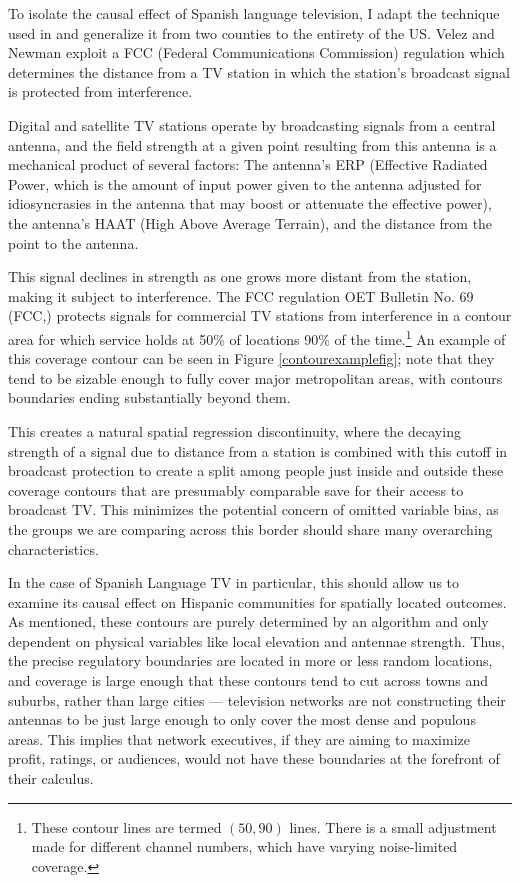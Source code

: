 \documentclass[11pt]{article}
\begin{document}
To isolate the causal effect of Spanish language television, I adapt the technique used in \cite{velez_tuning_2019}  and generalize it from two counties to the entirety of the US. Velez and Newman exploit a FCC (Federal Communications Commission) regulation which determines the distance from a TV station in which the station's broadcast signal is protected from interference.

Digital and satellite TV stations operate by broadcasting signals from a central antenna, and the field strength at a given point resulting from this antenna is a mechanical product of several factors: The antenna's ERP (Effective Radiated Power, which is the amount of input power given to the antenna adjusted for idiosyncrasies in the antenna that may boost or attenuate the effective power), the antenna's HAAT (High Above Average Terrain), and the distance from the point to the antenna.


This signal declines in strength as one grows more distant from the station, making it subject to interference. The FCC regulation OET Bulletin No. 69 (FCC,\cite{noauthor_oet_2004}) protects signals for commercial TV stations from interference in a contour area for which service holds at 50\% of locations 90\% of the time.\footnote{ These contour lines are termed $(50,90)$ lines. There is a small adjustment made for different channel numbers, which have varying noise-limited coverage. } An example of this coverage contour can be seen in Figure \ref{contourexamplefig}; note that they tend to be sizable enough to fully cover major metropolitan areas, with contours boundaries ending substantially beyond them.

This creates a natural spatial regression discontinuity, where the decaying strength of a signal due to distance from a station is combined with this cutoff in broadcast protection to create a split among people just inside and outside these coverage contours that are presumably comparable save for their access to broadcast TV.  This minimizes the potential concern of omitted variable bias, as the groups we are comparing across this border should share many overarching characteristics.

In the case of Spanish Language TV in particular, this should allow us to examine its causal effect on Hispanic communities for spatially located outcomes. As mentioned, these contours are purely determined by an algorithm and only dependent on physical variables like local elevation and antennae strength. Thus, the precise regulatory boundaries are located in more or less random locations, and coverage is large enough that these contours tend to cut across towns and suburbs, rather than large cities --- television networks are not constructing their antennas to be just large enough to only cover the most dense and populous areas. This implies that network executives, if they are aiming to maximize profit, ratings, or audiences, would not have these boundaries at the forefront of their calculus.
\end{document}
